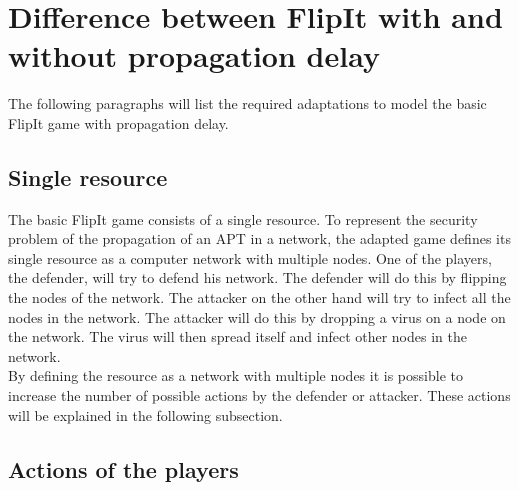 \section{Difference between FlipIt with and without propagation delay}
\label{ch2:diffFlip}


The following paragraphs will list the required adaptations to model the basic FlipIt game with propagation delay.

\subsection{Single resource}
The basic FlipIt game consists of a single resource. To represent the security problem of the propagation of an APT in a network, the adapted game defines its single resource as a computer network with multiple
nodes. One of the players, the defender, will try to defend his network.
The defender will do this by flipping the nodes of the network.
The attacker on the other hand will try to infect all the nodes in the network. 
The attacker will do this by dropping a virus on a node on the network. The virus will then spread itself and infect other nodes in the network. \\
By defining the resource as a network with multiple nodes it is possible to increase the number of possible actions by the defender or attacker. These actions will be explained in the following subsection.
\subsection{Actions of the players}


